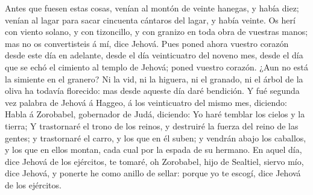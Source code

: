  Antes que fuesen estas cosas, venían al montón de veinte
hanegas, y había diez; venían al lagar para sacar cincuenta cántaros del
lagar, y había veinte.  Os herí con viento solano, y con
tizoncillo, y con granizo en toda obra de vuestras manos; mas no os
convertisteis á mí, dice Jehová.  Pues poned ahora
vuestro corazón desde este día en adelante, desde el día veinticuatro
del noveno mes, desde el día que se echó el cimiento al templo de
Jehová; poned vuestro corazón.  ¿Aun no está la simiente
en el granero? Ni la vid, ni la higuera, ni el granado, ni el árbol de
la oliva ha todavía florecido: mas desde aqueste día daré bendición.
 Y fué segunda vez palabra de Jehová á Haggeo, á los
veinticuatro del mismo mes, diciendo:  Habla á Zorobabel,
gobernador de Judá, diciendo: Yo haré temblar los cielos y la tierra;
 Y trastornaré el trono de los reinos, y destruiré la
fuerza del reino de las gentes; y trastornaré el carro, y los que en él
suben; y vendrán abajo los caballos, y los que en ellos montan, cada
cual por la espada de su hermano.  En aquel día, dice
Jehová de los ejércitos, te tomaré, oh Zorobabel, hijo de Sealtiel,
siervo mío, dice Jehová, y ponerte he como anillo de sellar: porque yo
te escogí, dice Jehová de los ejércitos.
